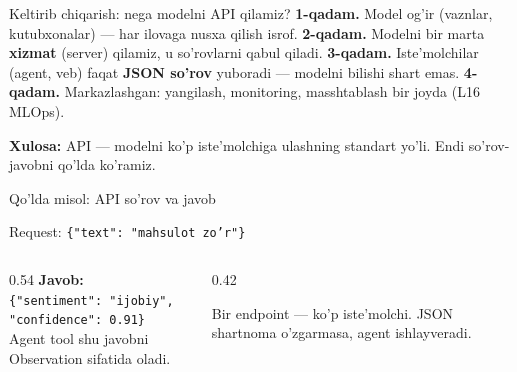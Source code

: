 \documentclass[aspectratio=169,11pt]{beamer}
\begin{document}
\begin{frame}{Keltirib chiqarish: nega modelni API qilamiz?}
  \textbf{1-qadam.} Model og'ir (vaznlar, kutubxonalar) --- har ilovaga nusxa
  qilish isrof.
  \pause
  \textbf{2-qadam.} Modelni bir marta \textbf{xizmat} (server) qilamiz, u
  so'rovlarni qabul qiladi.
  \pause
  \textbf{3-qadam.} Iste'molchilar (agent, veb) faqat \textbf{JSON so'rov}
  yuboradi --- modelni bilishi shart emas.
  \pause
  \textbf{4-qadam.} Markazlashgan: yangilash, monitoring, masshtablash bir
  joyda (L16 MLOps).
  \begin{tcolorbox}[okbox,top=2pt,bottom=2pt]
    \small \textbf{Xulosa:} API --- modelni ko'p iste'molchiga ulashning standart
    yo'li. Endi so'rov-javobni qo'lda ko'ramiz.
  \end{tcolorbox}
\end{frame}

\begin{frame}{Qo'lda misol: API so'rov va javob}
  \begin{tcolorbox}[defbox,title={\texttt{POST /predict} (m13 sentiment xizmati)}]
    \footnotesize
    Request: \texttt{\{"text": "mahsulot zo'r"\}}
  \end{tcolorbox}
  \vspace{0.2em}
  \begin{columns}[T]
    \begin{column}{0.54\textwidth}
      \textbf{Javob:}\\[2pt]
      \footnotesize
      \texttt{\{"sentiment": "ijobiy",}\\
      \texttt{\phantom{x}"confidence": 0.91\}}\\[4pt]
      Agent tool shu javobni Observation sifatida oladi.
    \end{column}
    \begin{column}{0.42\textwidth}
      \begin{tcolorbox}[okbox,top=2pt,bottom=2pt]
        \footnotesize
        Bir endpoint --- ko'p iste'molchi. JSON shartnoma o'zgarmasa, agent
        ishlayveradi.
      \end{tcolorbox}
    \end{column}
  \end{columns}
\end{frame}
\end{document}
